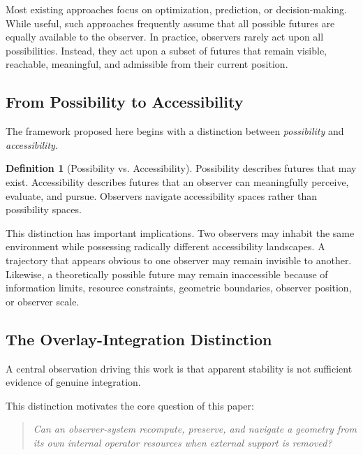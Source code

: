 \documentclass[12pt]{article}
\theoremstyle{plain}
\theoremstyle{definition}
\newtheorem{definition}[theorem]{Definition}
\theoremstyle{remark}
\begin{document}
Most existing approaches focus on optimization, prediction, or decision-making. While useful, such approaches frequently assume that all possible futures are equally available to the observer. In practice, observers rarely act upon all possibilities. Instead, they act upon a subset of futures that remain visible, reachable, meaningful, and admissible from their current position.

\subsection{From Possibility to Accessibility}

The framework proposed here begins with a distinction between \emph{possibility} and \emph{accessibility}.

\begin{definition}[Possibility vs. Accessibility]
\statusdef
Possibility describes futures that may exist. Accessibility describes futures that an observer can meaningfully perceive, evaluate, and pursue. Observers navigate accessibility spaces rather than possibility spaces.
\end{definition}

This distinction has important implications. Two observers may inhabit the same environment while possessing radically different accessibility landscapes. A trajectory that appears obvious to one observer may remain invisible to another. Likewise, a theoretically possible future may remain inaccessible because of information limits, resource constraints, geometric boundaries, observer position, or observer scale.

\subsection{The Overlay-Integration Distinction}

A central observation driving this work is that apparent stability is not sufficient evidence of genuine integration.


This distinction motivates the core question of this paper:

\begin{quote}
\textit{Can an observer-system recompute, preserve, and navigate a geometry from its own internal operator resources when external support is removed?}
\end{quote}
\end{document}
